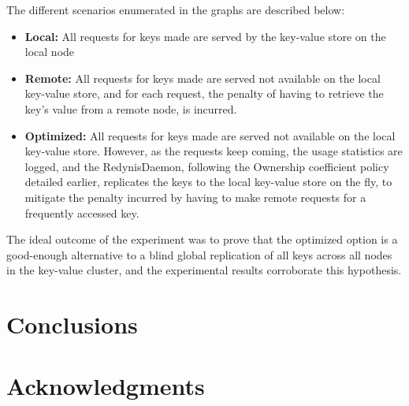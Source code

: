 \documentclass{sig-alternate}
\begin{document}
The different scenarios enumerated in the graphs are described below:
\begin{itemize}
	\item \textbf{Local:} All requests for keys made are served by the key-value store on the local node
	\item \textbf{Remote:} All requests for keys made are served not available on the local key-value store, and for each request, the penalty of having to retrieve the key's value from a remote node, is incurred.
	\item \textbf{Optimized:} All requests for keys made are served not available on the local key-value store. However, as the requests keep coming, the usage statistics are logged, and the RedynisDaemon, following the Ownership coefficient policy detailed earlier, replicates the keys to the local key-value store on the fly, to mitigate the penalty incurred by having to make remote requests for a frequently accessed key.
\end{itemize}

The ideal outcome of the experiment was to prove that the optimized option is a good-enough alternative to a blind global replication of all keys across all nodes in the key-value cluster, and the experimental results corroborate this hypothesis.


\section{Conclusions}


\section{Acknowledgments}




\end{document}
